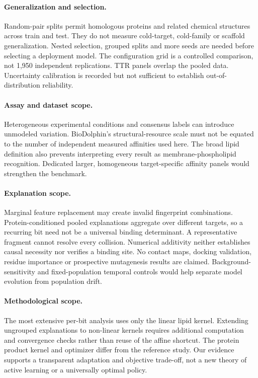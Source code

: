 \documentclass[wcp]{jmlr}
\begin{document}
\paragraph{Generalization and selection.}
Random-pair splits permit homologous proteins and related chemical
structures across train and test. They do not measure cold-target,
cold-family or scaffold generalization. Nested selection, grouped splits
and more seeds are needed before selecting a deployment model. The
configuration grid is a controlled comparison, not 1,950 independent
replications. TTR panels overlap the pooled data. Uncertainty calibration
is recorded but not sufficient to establish out-of-distribution reliability.

\paragraph{Assay and dataset scope.}
Heterogeneous experimental conditions and consensus labels can introduce
unmodeled variation. BioDolphin's structural-resource scale must not be
equated to the number of independent measured affinities used here.
The broad lipid definition also prevents interpreting every result as
membrane-phospholipid recognition. Dedicated larger, homogeneous
target-specific affinity panels would strengthen the benchmark.

\paragraph{Explanation scope.}
Marginal feature replacement may create invalid fingerprint combinations.
Protein-conditioned pooled explanations aggregate over different targets,
so a recurring bit need not be a universal binding determinant. A
representative fragment cannot resolve every collision. Numerical
additivity neither establishes causal necessity nor verifies a binding
site. No contact maps, docking validation, residue importance or prospective
mutagenesis results are claimed. Background-sensitivity and fixed-population
temporal controls would help separate model evolution from population drift.

\paragraph{Methodological scope.}
The most extensive per-bit analysis uses only the linear lipid kernel.
Extending ungrouped explanations to non-linear kernels requires additional
computation and convergence checks rather than reuse of the affine shortcut.
The protein product kernel and optimizer differ from the reference study.
Our evidence supports a transparent adaptation and objective trade-off,
not a new theory of active learning or a universally optimal policy.
\end{document}
